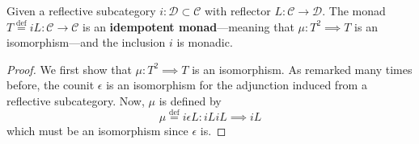 \begin{theorem}
  Given a reflective subcategory $ i: \mathcal{D} \subset \mathcal{C} $ with reflector $ L: \mathcal{C} \to \mathcal{D} $. The monad $ T \stackrel{\text{def}}{=} iL: \mathcal{C} \to \mathcal{C} $ is an \textbf{idempotent monad}---meaning that $ \mu: T^2 \implies T $ is an isomorphism---and the inclusion $ i $ is monadic.
\end{theorem}
\begin{proof}
  We first show that $ \mu: T^2 \implies T $ is an isomorphism. As remarked many times before, the counit $ \epsilon $ is an isomorphism for the adjunction induced from a reflective subcategory. Now, $ \mu $ is defined by
  \begin{equation}
    \mu\stackrel{\text{def}}{=} i\epsilon L: iLiL \implies iL
  \end{equation}
  which must be an isomorphism since $ \epsilon $ is.



\end{proof}
